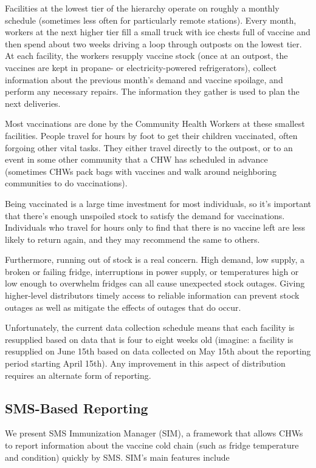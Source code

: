 \documentclass{acm_proc_article-sp}
\begin{document}
Facilities at the lowest tier of the hierarchy operate on roughly a monthly schedule (sometimes less often for particularly remote stations). Every month, workers at the next higher tier fill a small truck with ice chests full of vaccine and then spend about two weeks driving a loop through outposts on the lowest tier. At each facility, the workers resupply vaccine stock (once at an outpost, the vaccines are kept in propane- or electricity-powered refrigerators), collect information about the previous month's demand and vaccine spoilage, and perform any necessary repairs. The information they gather is used to plan the next deliveries. 

Most vaccinations are done by the Community Health Workers at these smallest facilities. People travel for hours by foot to get their children vaccinated, often forgoing other vital tasks. They either travel directly to the outpost, or to an event in some other community that a CHW has scheduled in advance (sometimes CHWs pack bags with vaccines and walk around neighboring communities to do vaccinations). 

Being vaccinated is a large time investment for most individuals, so it's important that there's enough unspoiled stock to satisfy the demand for vaccinations. Individuals who travel for hours only to find that there is no vaccine left are less likely to return again, and they may recommend the same to others. 

Furthermore, running out of stock is a real concern. High demand, low supply, a broken or failing fridge, interruptions in power supply, or temperatures high or low enough to overwhelm fridges can all cause unexpected stock outages. Giving higher-level distributors timely access to reliable information can prevent stock outages as well as mitigate the effects of outages that do occur. 

Unfortunately, the current data collection schedule means that each facility is resupplied based on data that is four to eight weeks old (imagine: a facility is resupplied on June 15th based on data collected on May 15th about the reporting period starting April 15th). Any improvement in this aspect of distribution requires an alternate form of reporting. 

\subsection{SMS-Based Reporting}

We present SMS Immunization Manager (SIM), a framework that allows CHWs to report information about the vaccine cold chain (such as fridge temperature and condition) quickly by SMS. SIM's main features include 
\end{document}
